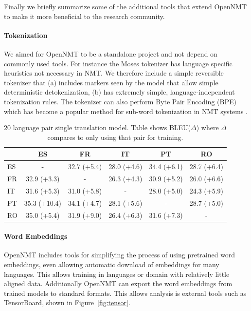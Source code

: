 \documentclass[11pt,a4paper]{article}
\begin{document}
Finally we briefly summarize some of the additional tools that extend
OpenNMT to make it more beneficial to the research community.

\paragraph{Tokenization} We aimed for OpenNMT to be a standalone project
and not depend on commonly used tools.  For instance the Moses
tokenizer has language specific heuristics not necessary in NMT. We
therefore include a simple reversible tokenizer that (a) includes
markers seen by the model that allow simple deterministic
detokenization, (b) has extremely simple, language-independent
tokenization rules. The tokenizer can also perform Byte Pair Encoding
(BPE) which has become a popular method for sub-word tokenization
 in NMT systems \cite{DBLP:journals/corr/SennrichHB15}.

\begin{table}
   \centering
  \begin{tabular}{lccccc}
    \toprule
          & ES & FR & IT & PT & RO \\
    \midrule
ES	& - &  32.7 (+5.4)	 &  28.0 (+4.6) &  34.4 (+6.1) &  28.7 (+6.4) \\ 
FR	&  32.9 (+3.3)	& -  &  26.3 (+4.3)	 &  30.9 (+5.2) &  26.0 (+6.6) \\
IT     &  31.6 (+5.3)	 &  31.0 (+5.8) & - &  28.0 (+5.0) &  24.3 (+5.9) \\
PT	&  35.3 (+10.4) &  34.1 (+4.7) &  28.1 (+5.6) & - &  28.7 (+5.0) \\
RO	&  35.0 (+5.4) &  31.9 (+9.0) &  26.4 (+6.3) &  31.6 (+7.3) & -\\
    \bottomrule
  \end{tabular}

  \caption{  \label{tab:esfritptro}  20 language pair single translation model. Table shows BLEU($\Delta$) where $\Delta$ compares to only using that pair for training. }
\end{table}

 \paragraph{Word Embeddings} OpenNMT includes tools for simplifying
 the process of using pretrained word embeddings, even allowing
 automatic download of embeddings for many languages. This allows
training in languages or domain with relatively little aligned data.
Additionally OpenNMT can export the word embeddings from trained 
models to standard formats. This allows analysis is external tools 
such as TensorBoard, shown in Figure~\ref{fig:tensor}.
\end{document}
